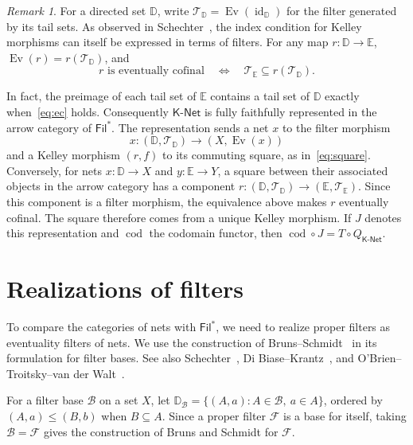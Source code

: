 \documentclass[11pt,a4paper]{article}
\theoremstyle{definition}
\theoremstyle{remark}
\newtheorem{remark}[theorem]{Remark}
\newcommand{\Filp}{\mathsf{Fil}^{*}}
\newcommand{\Kpar}{\mathsf{K\text{-}Net}}
\newcommand{\FF}{\mathcal F}
\newcommand{\BB}{\mathcal B}
\newcommand{\TT}{\mathcal T}
\newcommand{\Ev}{\operatorname{Ev}}
\newcommand{\id}{\operatorname{id}}
\begin{document}
\begin{remark}\label{rem:filterarrows}
For a directed set \(\mathbb D\), write \(\TT_{\mathbb D}=\Ev(\id_{\mathbb D})\)
for the filter generated by its tail sets. As observed in Schechter~\cite[Section 7.15(b)]{Schechter}, the index
condition for Kelley morphisms can itself be expressed in terms of filters. For any map \(r:\mathbb{D}\to\mathbb{E}\),
\(\Ev(r)=r(\TT_{\mathbb{D}})\), and
\[
 r\text{ is eventually cofinal}\quad\Leftrightarrow\quad
 \TT_{\mathbb{E}}\subseteq r(\TT_{\mathbb{D}}).
\]

In fact, the preimage of each tail set of \(\mathbb{E}\) contains a tail set
of \(\mathbb{D}\) exactly when~\eqref{eq:ec} holds.
Consequently \(\Kpar\) is fully faithfully represented in the arrow category of \(\Filp\). The representation sends a net \(x\) to
the filter morphism
\[
 x:(\mathbb{D},\TT_{\mathbb{D}})\to(X,\Ev(x))
\]
and a Kelley morphism \((r,f)\) to its commuting square, as
in~\eqref{eq:square}. Conversely,
for nets \(x:\mathbb D\to X\) and \(y:\mathbb E\to Y\), a square
between their associated objects in the arrow category has a
component \(r:(\mathbb D,\TT_{\mathbb D})\to
(\mathbb E,\TT_{\mathbb E})\). Since this component is a filter
morphism, the equivalence above makes \(r\) eventually cofinal.
The square therefore comes from a unique Kelley morphism.
If \(J\) denotes this representation and \(\operatorname{cod}\)
the codomain functor, then \(\operatorname{cod}\circ J=T\circ Q_{\Kpar}\).
\end{remark}

\section{Realizations of filters}\label{sec:canonical}
To compare the categories of nets with \(\Filp\), we need to realize
proper filters as eventuality filters of nets. We use the construction of Bruns--Schmidt~\cite[Section 3,
pp. 170--171]{BS} in its formulation for filter bases. See also
Schechter~\cite[Section 7.11]{Schechter},
Di Biase--Krantz~\cite[Lemma 6.3]{DBK}, and
O'Brien--Troitsky--van der Walt~\cite[Proposition 5.1]{OTW}.

For a filter base \(\BB\) on a set \(X\), let
\(\mathbb{D}_{\BB}=\{(A,a):A\in\BB,\ a\in A\}\), ordered by
\((A,a)\le(B,b)\) when \(B\subseteq A\). Since a proper filter
\(\FF\) is a base for itself, taking \(\BB=\FF\) gives the
construction of Bruns and Schmidt for \(\FF\).
\end{document}
